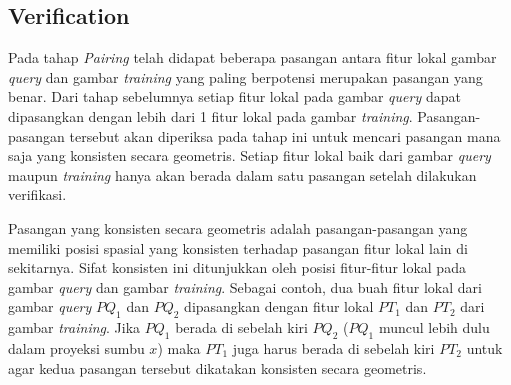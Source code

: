 \subsection{Verification}
Pada tahap \textit{Pairing} telah didapat beberapa pasangan antara fitur lokal gambar \textit{query} dan gambar \textit{training} yang paling berpotensi merupakan pasangan yang benar. Dari tahap sebelumnya setiap fitur lokal pada gambar \textit{query} dapat dipasangkan dengan lebih dari 1 fitur lokal pada gambar \textit{training}. Pasangan-pasangan tersebut akan diperiksa pada tahap ini untuk mencari pasangan mana saja yang konsisten secara geometris. Setiap fitur lokal baik dari gambar \textit{query} maupun \textit{training} hanya akan berada dalam satu pasangan setelah dilakukan verifikasi.

Pasangan yang konsisten secara geometris adalah pasangan-pasangan yang memiliki posisi spasial yang konsisten terhadap pasangan fitur lokal lain di sekitarnya. Sifat konsisten ini ditunjukkan oleh posisi fitur-fitur lokal pada gambar \textit{query} dan gambar \textit{training}. Sebagai contoh, dua buah fitur lokal dari gambar \textit{query} $PQ_1$ dan $PQ_2$ dipasangkan dengan fitur lokal $PT_1$ dan $PT_2$ dari gambar \textit{training}. Jika $PQ_1$ berada di sebelah kiri $PQ_2$ ($PQ_1$ muncul lebih dulu dalam proyeksi sumbu $x$) maka $PT_1$ juga harus berada di sebelah kiri $PT_2$ untuk agar kedua pasangan tersebut dikatakan konsisten secara geometris.

